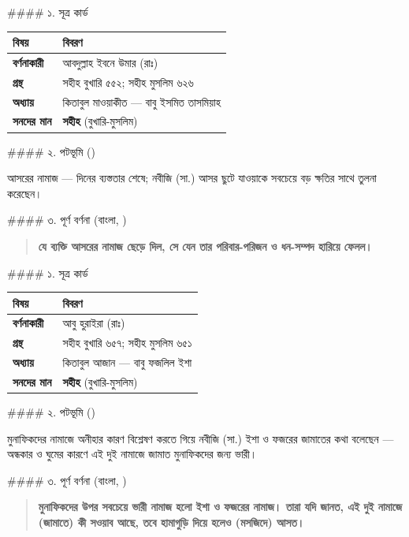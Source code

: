 \#\#\#\# ১. সূত্র কার্ড

\begin{table}[h]\centering\small
\begin{tabular}{ll}
বিষয় & বিবরণ \\
\hline
\textbf{বর্ণনাকারী} & আবদুল্লাহ ইবনে উমার (রাঃ) \\
\textbf{গ্রন্থ} & সহীহ বুখারি ৫৫২; সহীহ মুসলিম ৬২৬ \\
\textbf{অধ্যায়} & কিতাবুল মাওয়াকীত — বাবু ইসমিত তাসমিয়াহ \\
\textbf{সনদের মান} & \textbf{সহীহ} (বুখারি-মুসলিম) \\
\hline
\end{tabular}
\end{table}

\#\#\#\# ২. পটভূমি ()

আসরের নামাজ — দিনের ব্যস্ততার শেষে; নবীজি (সা.) আসর ছুটে যাওয়াকে সবচেয়ে বড় ক্ষতির সাথে তুলনা করেছেন।

\#\#\#\# ৩. পূর্ণ বর্ণনা (বাংলা, )

\begin{quote}
\textbf{যে ব্যক্তি আসরের নামাজ ছেড়ে দিল, সে যেন তার পরিবার-পরিজন ও ধন-সম্পদ হারিয়ে ফেলল।}
\end{quote}

\#\#\#\# ১. সূত্র কার্ড

\begin{table}[h]\centering\small
\begin{tabular}{ll}
বিষয় & বিবরণ \\
\hline
\textbf{বর্ণনাকারী} & আবু হুরাইরা (রাঃ) \\
\textbf{গ্রন্থ} & সহীহ বুখারি ৬৫৭; সহীহ মুসলিম ৬৫১ \\
\textbf{অধ্যায়} & কিতাবুল আজান — বাবু ফজলিল ইশা \\
\textbf{সনদের মান} & \textbf{সহীহ} (বুখারি-মুসলিম) \\
\hline
\end{tabular}
\end{table}

\#\#\#\# ২. পটভূমি ()

মুনাফিকদের নামাজে অনীহার কারণ বিশ্লেষণ করতে গিয়ে নবীজি (সা.) ইশা ও ফজরের জামাতের কথা বলেছেন — অন্ধকার ও ঘুমের কারণে এই দুই নামাজে জামাত মুনাফিকদের জন্য ভারী।

\#\#\#\# ৩. পূর্ণ বর্ণনা (বাংলা, )

\begin{quote}
\textbf{মুনাফিকদের উপর সবচেয়ে ভারী নামাজ হলো ইশা ও ফজরের নামাজ। তারা যদি জানত, এই দুই নামাজে (জামাতে) কী সওয়াব আছে, তবে হামাগুড়ি দিয়ে হলেও (মসজিদে) আসত।}
\end{quote}

